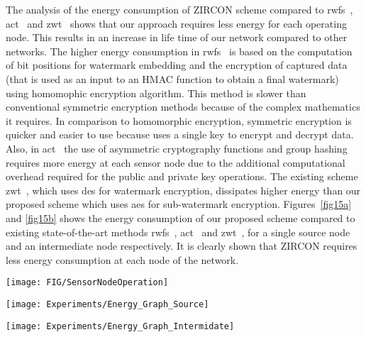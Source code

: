 \documentclass{llncs}
\begin{document}
The analysis of the energy consumption of ZIRCON scheme compared to \gls*{rwfs}~\cite{Alromith2018}, \gls*{act}~\cite{Sun2013} and \gls*{zwt}~\cite{hameed2018} shows that our approach requires less energy for each operating node. This results in an increase in life time of our network compared to other networks. The higher energy consumption in \gls*{rwfs}~\cite{Alromith2018} is based on the computation of bit positions for watermark embedding and the encryption of captured data (that is used as an input to an HMAC function to obtain a final watermark) using homomophic encryption algorithm. This method is slower than conventional symmetric encryption methods because of the complex mathematics it requires. In comparison to homomorphic encryption, symmetric encryption is quicker and easier to use because uses a single key to encrypt and decrypt data. Also, in \gls*{act}~\cite{Sun2013} the use of asymmetric cryptography functions and group hashing requires more energy at each sensor node due to the additional computational overhead required for the public and private key operations. The existing scheme \gls*{zwt}~\cite{hameed2018}, which uses \gls*{des} for watermark encryption, dissipates higher energy than our proposed scheme which uses \gls*{aes} for sub-watermark encryption. Figures~\ref{fig15a} and \ref{fig15b} shows the energy consumption of our proposed scheme compared to existing state-of-the-art methods \gls*{rwfs}~\cite{Alromith2018}, \gls*{act}~\cite{Sun2013} and \gls*{zwt}~\cite{hameed2018}, for a single source node and an intermediate node respectively. It is clearly shown that ZIRCON requires less energy consumption at each node of the network. 

\begin{figure*}[!htbp]
\centerline{\texttt{[image: FIG/SensorNodeOperation]}}
\caption{Sensor node operation cycle.}
\label{fig14}
\end{figure*}


\begin{figure*}[!htbp]
\centerline{\texttt{[image: Experiments/Energy\_Graph\_Source]}}
\caption{Energy consumption cost per single source node.}
\label{fig15a}
\end{figure*}

\begin{figure*}[!htbp]
\centerline{\texttt{[image: Experiments/Energy\_Graph\_Intermidate]}}
\caption{Energy consumption cost per single intermediate node.}
\label{fig15b}
\end{figure*}
\end{document}
